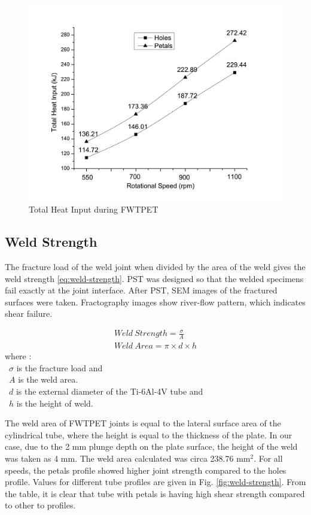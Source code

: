 \documentclass[3p]{elsarticle}
\begin{document}
\begin{figure}[H]
\centering
\includegraphics[width=\textwidth,keepaspectratio]{images/Total HI.jpg}
\caption{Total Heat Input during FWTPET}
\label{fig:total-heat-input}
\end{figure}

\subsection{Weld Strength}
\label{subsec:Weld Strength}
 The fracture load of the weld joint when divided by the area of the weld gives the weld strength \ref{eq:weld-strength}. PST was designed so that the welded specimens fail exactly at the joint interface. After PST, SEM images of the fractured surfaces were taken. Fractography images show river-flow pattern, which indicates shear failure.

\begin{gather} 
Weld\:Strength = \frac{\sigma}{A} \label{eq:weld-strength} \\
Weld\:Area = \pi \times d \times h \label{eq:weld-area}
\end{gather}
where :\\
~$\sigma$ is the fracture load and \\
~$A$ is the weld area. \\
~$d$ is the external diameter of the Ti-6Al-4V tube and \\
~$h$ is the height of weld.

The weld area of FWTPET joints is equal to the lateral surface area of the cylindrical tube, where the height is equal to the thickness of the plate. In our case, due to the 2 mm plunge depth on the plate surface, the height of the weld was taken as 4 mm. The weld area calculated was circa 238.76 mm$^{2}$. For all speeds, the petals profile showed higher joint strength compared to the holes profile. Values for different tube profiles are given in Fig. \ref{fig:weld-strength}. From the table, it is clear that tube with petals is having high shear strength compared to other to profiles.
\end{document}
